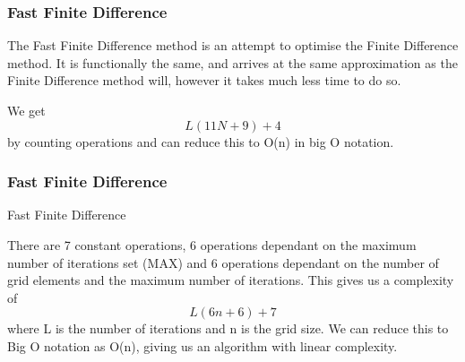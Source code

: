 \documentclass[aps,twocolumn,pre,nofootinbib,10pt]{revtex4-1}
\begin{document}
\subsubsection{Fast Finite Difference}

The Fast Finite Difference method is an attempt to optimise the Finite Difference method. It is functionally the same, and arrives at the same approximation as the Finite Difference method will, however it takes much less time to do so.

We get \[L(11N+9)+4\] by counting operations and can reduce this to O(n) in big O notation.

\subsubsection{Fast Finite Difference}
\begin{algorithm}
    \caption{Fast Finite Difference}
    \label{alg:ffd}
    \begin{algorithmic}[1]
                            \EndIf
                        \EndIf
                    \EndFor
                \EndFor
            \EndFor
        \EndFunction
    \end{algorithmic}
\end{algorithm}

There are 7 constant operations, 6 operations dependant on the maximum number of iterations set (MAX) and 6 operations dependant on the number of grid elements and the maximum number of iterations. This gives us a complexity of \[L(6n + 6) + 7\] where L is the number of iterations and n is the grid size. We can reduce this to Big O notation as O(n), giving us an algorithm with linear complexity.
\end{document}
